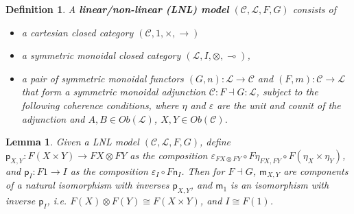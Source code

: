 \documentclass{article}
\newtheorem{lemma}[theorem]{Lemma}
\newtheorem{definition}[theorem]{Definition}
\let\mto\to
\let\to\relax
\newcommand{\to}{\rightarrow}
\newcommand{\cat}[1]{\mathcal{#1}}
\newcommand{\limp}[0]{\multimap}
\newcommand{\m}[1]{\mathsf{m}_{#1}}
\newcommand{\n}[1]{\mathsf{n}_{#1}}
\newcommand{\p}[1]{\mathsf{p}_{#1}}
\begin{document}
\begin{definition}
  \label{def:LNL}
  A \textbf{linear/non-linear (LNL) model} $(\cat{C},\cat{L},F,G)$ consists of
  \begin{itemize}
  \item a cartesian closed category $(\cat{C},1,\times,\mto)$
  \item a symmetric monoidal closed category
  	$(\cat{L},I,\otimes,\limp)$,
  \item a pair of symmetric monoidal functors
  	$(G,n):\cat{L}\mto\cat{C}$ and
	$(F,m):\cat{C}\mto\cat{L}$ that form a symmetric monoidal
	adjunction $\cat{C}:F\dashv G:\cat{L}$, subject to the
	following coherence conditions, where $\eta$ and $\varepsilon$
	are the unit and counit of the adjunction and
	$A,B\in Ob(\cat{L})$, $X,Y\in Ob(\cat{C})$.
  \end{itemize}
\end{definition}


\begin{lemma}
  \label{lem:m-p-iso}
  Given a LNL model $(\cat{C},\cat{L},F,G)$, define
  $\p{X,Y}:F(X\times Y)\mto FX\otimes FY$ as the composition
  $\varepsilon_{FX\otimes FY}\circ F\eta_{FX,FY}\circ F(\eta_X\times\eta_Y)$,
  and $\p{I}:F1\mto I$ as the composition
  $\varepsilon_I\circ F\n{I}$. Then for $F\dashv G$,
  $\m{X,Y}$ are components of a natural isomorphism with inverses
  $\p{X,Y}$, and $\m{1}$ is an isomorphism with inverse $\p{I}$, i.e.
  $F(X)\otimes F(Y)\cong F(X\times Y)$, and $I\cong F(1)$.
\end{lemma}
\end{document}
